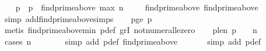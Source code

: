 \begin{isabellebody}
\ \ \isamarkupfalse%
\ p\ \ {\isachardoublequoteopen}p\ {\isacharequal}{\kern0pt}\ find{\isacharunderscore}{\kern0pt}prime{\isacharunderscore}{\kern0pt}above\ {\isacharparenleft}{\kern0pt}max\ n\ {}{\isacharparenright}{\kern0pt}{\isachardoublequoteclose}\isanewline
\isanewline
\ \ \isamarkupfalse%
\ find{\isacharunderscore}{\kern0pt}prime{\isacharunderscore}{\kern0pt}above{\isacharunderscore}{\kern0pt}{}{\isacharcolon}{\kern0pt}\ {\isachardoublequoteopen}find{\isacharunderscore}{\kern0pt}prime{\isacharunderscore}{\kern0pt}above\ {}\ {\isacharequal}{\kern0pt}\ {}{\isachardoublequoteclose}\ \isanewline
\ \ \ \ \isamarkupfalse%
\ {\isacharparenleft}{\kern0pt}simp\ add{\isacharcolon}{\kern0pt}find{\isacharunderscore}{\kern0pt}prime{\isacharunderscore}{\kern0pt}above{\isachardot}{\kern0pt}simps{\isacharparenright}{\kern0pt}\isanewline
\isanewline
\ \ \isamarkupfalse%
\ p{\isacharunderscore}{\kern0pt}ge{\isacharunderscore}{\kern0pt}{}{\isacharcolon}{\kern0pt}\ {\isachardoublequoteopen}p\ {\isachargreater}{\kern0pt}\ {}{\isachardoublequoteclose}\ \isanewline
\ \ \ \ \isamarkupfalse%
\ {\isacharparenleft}{\kern0pt}metis\ find{\isacharunderscore}{\kern0pt}prime{\isacharunderscore}{\kern0pt}above{\isacharunderscore}{\kern0pt}min\ p{\isacharunderscore}{\kern0pt}def\ gr{}I\ not{\isacharunderscore}{\kern0pt}numeral{\isacharunderscore}{\kern0pt}le{\isacharunderscore}{\kern0pt}zero{\isacharparenright}{\kern0pt}\isanewline
\ \ \isamarkupfalse%
\ p{\isacharunderscore}{\kern0pt}le{\isacharunderscore}{\kern0pt}n{\isacharcolon}{\kern0pt}\ {\isachardoublequoteopen}p\ {\isasymle}\ {}\ {\isacharasterisk}{\kern0pt}\ n\ {\isacharplus}{\kern0pt}\ {}{\isachardoublequoteclose}\ \isanewline
\ \ \ \ \isamarkupfalse%
\ {\isacharparenleft}{\kern0pt}cases\ {\isachardoublequoteopen}n\ {\isasymle}\ {}{\isachardoublequoteclose}{\isacharparenright}{\kern0pt}\isanewline
\ \ \ \ \isamarkupfalse%
\ {\isacharparenleft}{\kern0pt}simp\ add{\isacharcolon}{\kern0pt}\ p{\isacharunderscore}{\kern0pt}def\ find{\isacharunderscore}{\kern0pt}prime{\isacharunderscore}{\kern0pt}above{\isacharunderscore}{\kern0pt}{}{\isacharparenright}{\kern0pt}\ \isanewline
\ \ \ \ \isamarkupfalse%
\ {\isacharparenleft}{\kern0pt}simp\ add{\isacharcolon}{\kern0pt}\ p{\isacharunderscore}{\kern0pt}def{\isacharparenright}{\kern0pt}\ \isanewline

\end{isabellebody}
